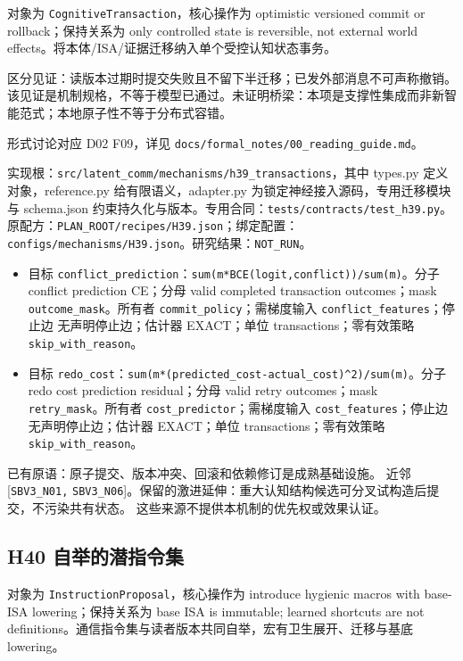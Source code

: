 \documentclass[
  10pt,
]{article}
\begin{document}
对象为 \nolinkurl{CognitiveTransaction}，核心操作为 optimistic versioned
commit or rollback；保持关系为 only controlled state is reversible, not
external world effects。将本体/ISA/证据迁移纳入单个受控认知状态事务。

区分见证：读版本过期时提交失败且不留下半迁移；已发外部消息不可声称撤销。
该见证是机制规格，不等于模型已通过。未证明桥梁：本项是支撑性集成而非新智能范式；本地原子性不等于分布式容错。

形式讨论对应 D02 F09，详见
{\small\nolinkurl{docs/formal_notes/00_reading_guide.md}}。

实现根：{\small\nolinkurl{src/latent_comm/mechanisms/h39_transactions}}，其中
types.py 定义对象，reference.py 给有限语义，adapter.py
为锁定神经接入源码，专用迁移模块与 schema.json
约束持久化与版本。专用合同：{\small\nolinkurl{tests/contracts/test_h39.py}}。原配方：{\small\nolinkurl{PLAN_ROOT/recipes/H39.json}}；绑定配置：{\small\nolinkurl{configs/mechanisms/H39.json}}。研究结果：\nolinkurl{NOT_RUN}。

\begin{itemize}
\item
  目标
  \nolinkurl{conflict_prediction}：{\small\nolinkurl{sum(m*BCE(logit,conflict))/sum(m)}}。分子
  conflict prediction CE；分母 valid completed transaction
  outcomes；mask \nolinkurl{outcome_mask}。所有者
  \nolinkurl{commit_policy}；需梯度输入
  \nolinkurl{conflict_features}；停止边 无声明停止边；估计器 EXACT；单位
  transactions；零有效策略 \nolinkurl{skip_with_reason}。
\item
  目标
  \nolinkurl{redo_cost}：{\small\nolinkurl{sum(m*(predicted_cost-actual_cost)^2)/sum(m)}}。分子
  redo cost prediction residual；分母 valid retry outcomes；mask
  \nolinkurl{retry_mask}。所有者 \nolinkurl{cost_predictor}；需梯度输入
  \nolinkurl{cost_features}；停止边 无声明停止边；估计器 EXACT；单位
  transactions；零有效策略 \nolinkurl{skip_with_reason}。
\end{itemize}

已有原语：原子提交、版本冲突、回滚和依赖修订是成熟基础设施。 近邻
{[}\nolinkurl{SBV3_N01,}
\nolinkurl{SBV3_N06}{]}。保留的激进延伸：重大认知结构候选可分叉试构造后提交，不污染共有状态。
这些来源不提供本机制的优先权或效果认证。

\subsection{H40
自举的潜指令集}\label{h40-ux81eaux4e3eux7684ux6f5cux6307ux4ee4ux96c6}

对象为 \nolinkurl{InstructionProposal}，核心操作为 introduce hygienic
macros with base-ISA lowering；保持关系为 base ISA is immutable; learned
shortcuts are not
definitions。通信指令集与读者版本共同自举，宏有卫生展开、迁移与基底
lowering。
\end{document}
